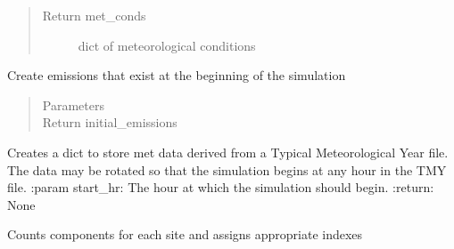 \documentclass[letterpaper,10pt,english]{sphinxmanual}
\begin{document}
\begin{fulllineitems}
\begin{fulllineitems}
\begin{quote}
\begin{description}
\begin{itemize}
\end{itemize}

\item[{Return met\_conds}] \leavevmode
dict of meteorological conditions

\end{description}\end{quote}

\end{fulllineitems}


\begin{fulllineitems}
\label{\detokenize{index:feast.EmissionSimModules.infrastructure_classes.GasField.initialize_emissions}}
Create emissions that exist at the beginning of the simulation
\begin{quote}\begin{description}
\item[{Parameters}] \leavevmode
{} \textendash{} 

\item[{Return initial\_emissions}] \leavevmode
\end{description}\end{quote}

\end{fulllineitems}


\begin{fulllineitems}
\label{\detokenize{index:feast.EmissionSimModules.infrastructure_classes.GasField.met_data_maker}}
Creates a dict to store met data derived from a Typical Meteorological Year file. The data may be rotated so
that the simulation begins at any hour in the TMY file.
:param start\_hr: The hour at which the simulation should begin.
:return: None

\end{fulllineitems}


\begin{fulllineitems}
\label{\detokenize{index:feast.EmissionSimModules.infrastructure_classes.GasField.set_indexes}}
Counts components for each site and assigns appropriate indexes

\end{fulllineitems}


\end{fulllineitems}
\end{document}
